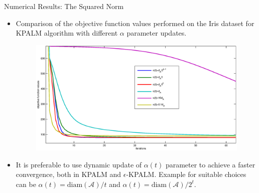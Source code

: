 \documentclass[9pt]{beamer}
\newcommand{\diam}{\mathrm{diam}} %
\begin{document}
	\begin{frame}{Numerical Results: The Squared Norm}
		\begin{itemize}[<+->]
            \item Comparison of the objective function values performed on the Iris dataset for KPALM algorithm with different $\alpha$ parameter updates.
		\begin{figure}
    		\centering
        	\includegraphics[width=0.8 \textwidth]{squared_norm_dyn_alpha_comp}
		\end{figure}
			\item It is preferable to use dynamic update of $\alpha(t)$ parameter to achieve a faster convergence, both in KPALM and $\epsilon$-KPALM. Example for suitable choices can be $\alpha(t)= \diam(\mathcal{A})/t$ and $\alpha(t)= \diam(\mathcal{A})/2^t$.
		\end{itemize}
	\end{frame}
	
\end{document}
